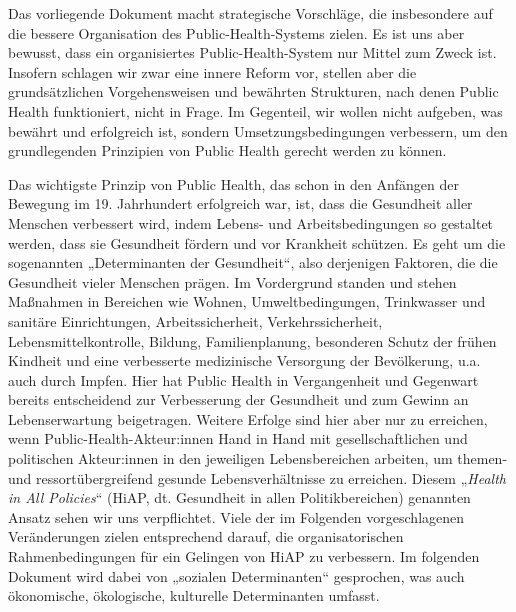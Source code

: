 \documentclass{article}
\begin{document}
Das vorliegende Dokument macht strategische Vorschläge, die insbesondere auf die bessere Organisation des Public-Health-Systems zielen. Es ist uns aber bewusst, dass ein organisiertes Public-Health-System nur Mittel zum Zweck ist. Insofern schlagen wir zwar eine innere Reform vor, stellen aber die grundsätzlichen Vorgehensweisen und bewährten Strukturen, nach denen Public Health funktioniert, nicht in Frage. Im Gegenteil, wir wollen nicht aufgeben, was bewährt und erfolgreich ist, sondern Umsetzungsbedingungen verbessern, um den grundlegenden Prinzipien von Public Health gerecht werden zu können.


Das wichtigste Prinzip von Public Health, das schon in den Anfängen der Bewegung im 19. Jahrhundert erfolgreich war, ist, dass die Gesundheit aller Menschen verbessert wird, indem Lebens- und Arbeitsbedingungen so gestaltet werden, dass sie Gesundheit fördern und vor Krankheit schützen. Es geht um die sogenannten „Determinanten der Gesundheit“, also derjenigen Faktoren, die die Gesundheit vieler Menschen prägen. Im Vordergrund standen und stehen Maßnahmen in Bereichen wie Wohnen, Umweltbedingungen, Trinkwasser und sanitäre Einrichtungen, Arbeitssicherheit, Verkehrssicherheit, Lebensmittelkontrolle, Bildung, Familienplanung, besonderen Schutz der frühen Kindheit und eine verbesserte medizinische Versorgung der Bevölkerung, u.a. auch durch Impfen. Hier hat Public Health in Vergangenheit und Gegenwart bereits entscheidend zur Verbesserung der Gesundheit und zum Gewinn an Lebenserwartung beigetragen. Weitere Erfolge sind hier aber nur zu erreichen, wenn Public-Health-Akteur:innen Hand in Hand mit gesellschaftlichen und politischen Akteur:innen in den jeweiligen Lebensbereichen arbeiten, um themen- und ressortübergreifend gesunde Lebensverhältnisse zu erreichen. Diesem „\emph{Health in All Policies}“ (HiAP, dt. Gesundheit in allen Politikbereichen) genannten Ansatz sehen wir uns verpflichtet. Viele der im Folgenden vorgeschlagenen Veränderungen zielen entsprechend darauf, die organisatorischen Rahmenbedingungen für ein Gelingen von HiAP zu verbessern. Im folgenden Dokument wird dabei von „sozialen Determinanten“ gesprochen, was auch ökonomische, ökologische, kulturelle Determinanten umfasst.
\end{document}
